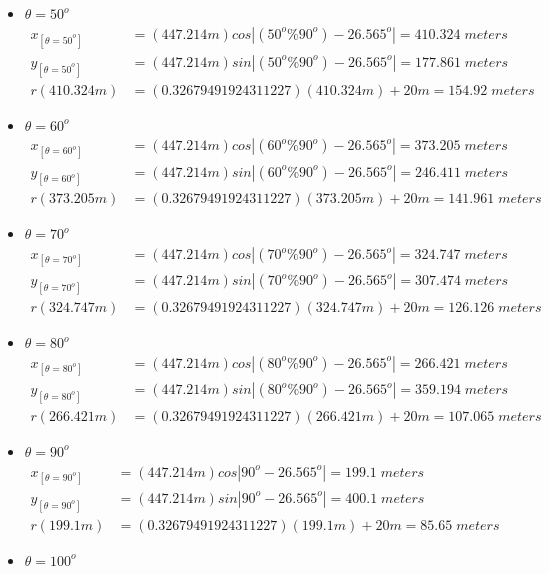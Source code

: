 \begin{itemize}
\item $\theta=50^o$
	\begin{align*}%
		x_{[\theta=50^o]} &=(447.214m) cos\left| (50^o\%90^o) - 26.565^o \right|  =410.324\;meters \\
		y_{[\theta=50^o]} &=(447.214m) sin\left| (50^o\%90^o) - 26.565^o \right|  =177.861\;meters \\
		r(410.324m) &=(0.32679491924311227)(410.324m)+20m  =154.92\;meters\end{align*}
\item $\theta=60^o$
	\begin{align*}%
		x_{[\theta=60^o]} &=(447.214m) cos\left| (60^o\%90^o) - 26.565^o \right|  =373.205\;meters \\
		y_{[\theta=60^o]} &=(447.214m) sin\left| (60^o\%90^o) - 26.565^o \right|  =246.411\;meters \\
		r(373.205m) &=(0.32679491924311227)(373.205m)+20m  =141.961\;meters\end{align*}
\item $\theta=70^o$
	\begin{align*}%
		x_{[\theta=70^o]} &=(447.214m) cos\left| (70^o\%90^o) - 26.565^o \right|  =324.747\;meters \\
		y_{[\theta=70^o]} &=(447.214m) sin\left| (70^o\%90^o) - 26.565^o \right|  =307.474\;meters \\
		r(324.747m) &=(0.32679491924311227)(324.747m)+20m  =126.126\;meters\end{align*}
\item $\theta=80^o$
	\begin{align*}%
		x_{[\theta=80^o]} &=(447.214m) cos\left| (80^o\%90^o) - 26.565^o \right|  =266.421\;meters \\
		y_{[\theta=80^o]} &=(447.214m) sin\left| (80^o\%90^o) - 26.565^o \right|  =359.194\;meters \\
		r(266.421m) &=(0.32679491924311227)(266.421m)+20m  =107.065\;meters\end{align*}
\item $\theta=90^o$
	\begin{align*}%
		x_{[\theta=90^o]} &=(447.214m) cos\left| 90^o - 26.565^o \right|  =199.1\;meters \\
		y_{[\theta=90^o]} &=(447.214m) sin\left| 90^o - 26.565^o \right|  =400.1\;meters \\
		r(199.1m) &=(0.32679491924311227)(199.1m)+20m  =85.65\;meters\end{align*}
\item $\theta=100^o$

\end{itemize}
